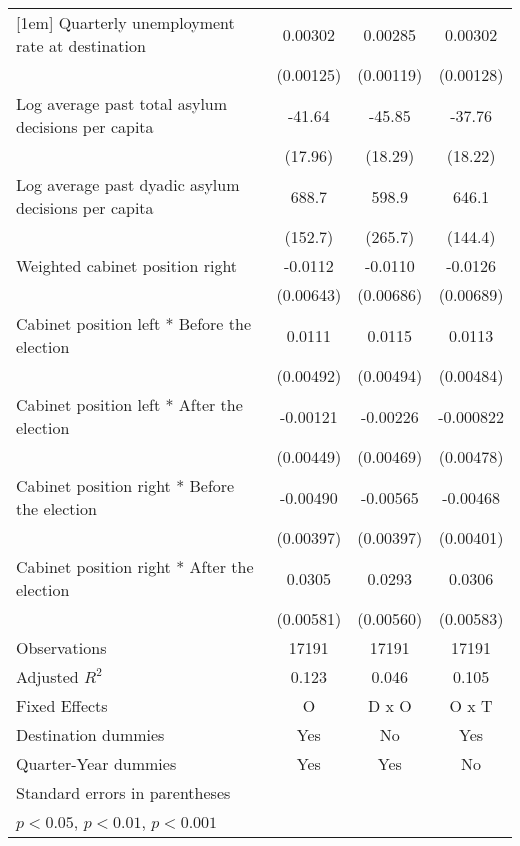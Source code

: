 \begin{table}[htbp]
\begin{tabular}{l*{3}{c}}
[1em]
Quarterly unemployment rate at destination&     0.00302\sym{*}  &     0.00285\sym{*}  &     0.00302\sym{*}  \\
                    &   (0.00125)         &   (0.00119)         &   (0.00128)         \\
[1em]
Log average past total asylum decisions per capita&      -41.64\sym{*}  &      -45.85\sym{*}  &      -37.76\sym{*}  \\
                    &     (17.96)         &     (18.29)         &     (18.22)         \\
[1em]
Log average past dyadic asylum decisions per capita&       688.7\sym{***}&       598.9\sym{*}  &       646.1\sym{***}\\
                    &     (152.7)         &     (265.7)         &     (144.4)         \\
[1em]
Weighted cabinet position right&     -0.0112         &     -0.0110         &     -0.0126         \\
                    &   (0.00643)         &   (0.00686)         &   (0.00689)         \\
[1em]
Cabinet position left * Before the election&      0.0111\sym{*}  &      0.0115\sym{*}  &      0.0113\sym{*}  \\
                    &   (0.00492)         &   (0.00494)         &   (0.00484)         \\
[1em]
Cabinet position left * After the election&    -0.00121         &    -0.00226         &   -0.000822         \\
                    &   (0.00449)         &   (0.00469)         &   (0.00478)         \\
[1em]
Cabinet position right * Before the election&    -0.00490         &    -0.00565         &    -0.00468         \\
                    &   (0.00397)         &   (0.00397)         &   (0.00401)         \\
[1em]
Cabinet position right * After the election&      0.0305\sym{***}&      0.0293\sym{***}&      0.0306\sym{***}\\
                    &   (0.00581)         &   (0.00560)         &   (0.00583)         \\
\hline
Observations        &       17191         &       17191         &       17191         \\
Adjusted \(R^{2}\)  &       0.123         &       0.046         &       0.105         \\
Fixed Effects       &           O         &       D x O         &       O x T         \\
Destination dummies &         Yes         &          No         &         Yes         \\
Quarter-Year dummies&         Yes         &         Yes         &          No         \\
\hline\hline
\multicolumn{4}{l}{\footnotesize Standard errors in parentheses}\\
\multicolumn{4}{l}{\footnotesize \sym{*} \(p<0.05\), \sym{**} \(p<0.01\), \sym{***} \(p<0.001\)}\\
\end{tabular}
\end{table}
